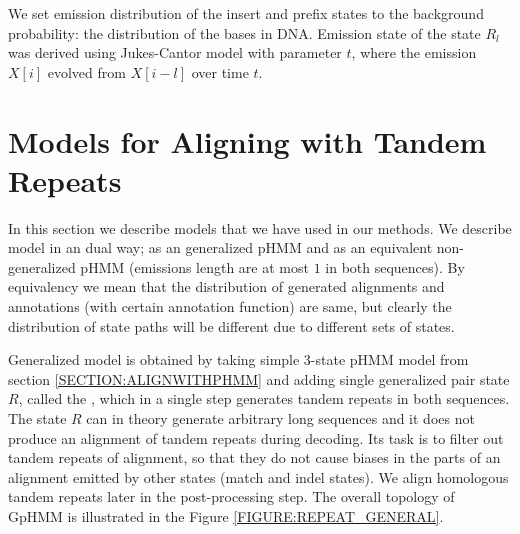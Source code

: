 We set emission distribution of the insert and prefix states to the background
probability: the distribution of the bases in DNA. Emission state of the state
$R_l$ was derived using Jukes-Cantor model with parameter $t$, where the
emission $X[i]$ evolved from $X[i-l]$ over time $t$.

\section{Models for Aligning with Tandem Repeats}\label{SECTION:REPMODELS}
In this section we describe models that we have used in our methods. We
describe model in an dual way; as an generalized pHMM and as an equivalent
non-generalized pHMM (emissions length are at most $1$ in both sequences).  By
equivalency we mean that the distribution of generated alignments and
annotations (with certain annotation function) are same, but clearly the
distribution of state paths will be different due to different sets of
states.

Generalized model is obtained by taking simple 3-state pHMM model from section
\ref{SECTION:ALIGNWITHPHMM} and adding single generalized pair state $R$,
called the , which in a single step generates tandem
repeats in both sequences. The state $R$ can in theory generate arbitrary long
sequences and it does not produce an alignment of tandem repeats during
decoding. Its task is to filter out tandem repeats of alignment, so that they
do not cause biases in the parts of an alignment emitted by other states (match
and indel states). We align homologous tandem repeats later in the
post-processing step. The overall topology of GpHMM is illustrated in the
Figure \ref{FIGURE:REPEAT_GENERAL}.


